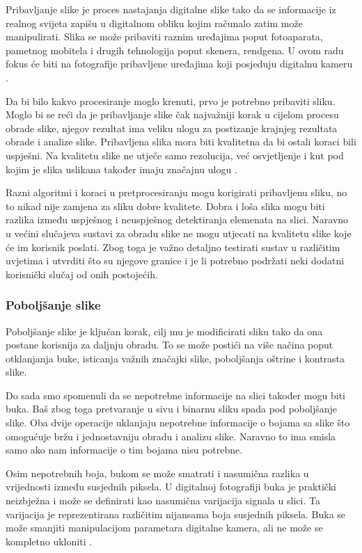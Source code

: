 \documentclass{foi}
\begin{document}
Pribavljanje slike je proces nastajanja digitalne slike tako da se informacije iz realnog svijeta zapišu u digitalnom obliku kojim računalo zatim može manipulirati. Slika se može pribaviti raznim uređajima poput fotoaparata, pametnog mobitela i drugih tehnologija poput skenera, rendgena. U ovom radu fokus će biti na fotografije pribavljene uređajima koji posjeduju digitalnu kameru \cite{BibEntry2025Apr}.


Da bi bilo kakvo procesiranje moglo krenuti, prvo je potrebno pribaviti sliku. Moglo bi se reći da je pribavljanje slike čak najvažniji korak u cijelom procesu obrade slike, njegov rezultat ima veliku ulogu za postizanje krajnjeg rezultata obrade i analize slike. Pribavljena slika mora biti kvalitetna da bi ostali koraci bili uspješni. Na kvalitetu slike ne utječe samo rezolucija, već osvjetljenje i kut pod kojim je slika uslikana također imaju značajnu ulogu \cite{BibEntry2025Apr}.

Razni algoritmi i koraci u pretprocesiranju mogu korigirati pribavljenu sliku, no to nikad nije zamjena za sliku dobre kvalitete. Dobra i loša slika mogu biti razlika između uspješnog i neuspješnog detektiranja elemenata na slici. Naravno u većini slučajeva sustavi za obradu slike ne mogu utjecati na kvalitetu slike koje će im korisnik poslati. Zbog toga je važno detaljno testirati sustav u različitim uvjetima i utvrditi što su njegove granice i je li potrebno podržati neki dodatni korisnički slučaj od onih postojećih.
\subsubsection{Poboljšanje slike}

Poboljšanje slike je ključan korak, cilj mu je modificirati sliku tako da ona postane korisnija za daljnju obradu. To se može postići na više načina poput otklanjanja buke, isticanja važnih značajki slike, poboljšanja oštrine i kontrasta slike.

Do sada smo spomenuli da se nepotrebne informacije na slici također mogu biti buka. Baš zbog toga pretvaranje u sivu i binarnu sliku spada pod poboljšanje slike. Oba dvije operacije uklanjaju nepotrebne informacije o bojama sa slike što omogućuje bržu i jednostavniju obradu i analizu slike. Naravno to ima smisla samo ako nam informacije o tim bojama nisu potrebne.

Osim nepotrebnih boja, bukom se može smatrati i nasumična razlika u vrijednosti između susjednih piksela. U digitalnoj fotografiji buka je praktički neizbježna i može se definirati kao nasumična varijacija signala u slici. Ta varijacija je reprezentirana različitim nijansama boja susjednih piksela. Buka se može smanjiti manipulacijom parametara digitalne kamera, ali ne može se kompletno ukloniti \cite{Adobe}.
\end{document}
